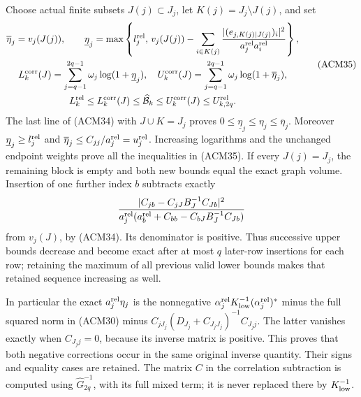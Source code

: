 Choose actual finite subsets $J(j)\subset J_j$, let
$K(j)=J_j\setminus J(j)$, and set
\[
\begin{gathered}
 \overline\eta_j=v_j(J(j)),\qquad
 \underline\eta_j=\max\left\{l_j^{\rm rel},\,
 v_j(J(j))-\sum_{i\in K(j)}
  \frac{|(e_{j,K(j)\mid J(j)})_i|^2}{a_j^{\rm rel}a_i^{\rm rel}}
                                                   \right\},\\
 L_k^{\rm corr}(J)=\sum_{j=q-1}^{2q-1}\omega_j\log(1+\underline\eta_j),
 \quad
 U_k^{\rm corr}(J)=\sum_{j=q-1}^{2q-1}\omega_j\log(1+\overline\eta_j),\\
 L_k^{\rm rel}\leq L_k^{\rm corr}(J)
 \leq\widehat{\mathcal B}_k\leq U_k^{\rm corr}(J)
 \leq U_{k,2q}^{\rm rel}.
\end{gathered}\tag{ACM35}
\]
The last line of (ACM34) with $J\cup K=J_j$ proves
$0\leq\underline\eta_j\leq\eta_j\leq\overline\eta_j$.
Moreover $\underline\eta_j\geq l_j^{\rm rel}$ and
$\overline\eta_j\leq C_{jj}/a_j^{\rm rel}=u_j^{\rm rel}$.
Increasing logarithms and the unchanged endpoint weights prove
all the inequalities in (ACM35). If every $J(j)=J_j$, the remaining
block is empty and both new bounds equal the exact graph volume.
Insertion of one further index $b$ subtracts exactly
\[
 \frac{|C_{jb}-C_{jJ}B_J^{-1}C_{Jb}|^2}
 {a_j^{\rm rel}(a_b^{\rm rel}+C_{bb}-C_{bJ}B_J^{-1}C_{Jb})}
\]
from $v_j(J)$, by (ACM34). Its denominator is positive. Thus
successive upper bounds decrease and become exact after at most
$q$ later-row insertions for each row; retaining the maximum
of all previous valid lower bounds makes that retained sequence
increasing as well.

In particular the exact $a_j^{\rm rel}\eta_j$ is the nonnegative
$\alpha_j^{\rm rel}K_{\rm low}^{-1}(\alpha_j^{\rm rel})^*$
minus the full squared norm in (ACM30) minus
$C_{jJ_j}(D_{J_j}+C_{J_jJ_j})^{-1}C_{J_jj}$.
The latter vanishes exactly when $C_{J_jj}=0$, because its
inverse matrix is positive. This proves that both negative
corrections occur in the same original inverse quantity.
Their signs and equality cases are retained. The matrix $C$
in the correlation subtraction is computed using
$\widehat G_{2q}^{-1}$, with its full mixed term; it is never
replaced there by $K_{\rm low}^{-1}$.
